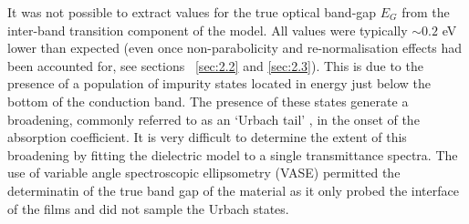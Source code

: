 \documentclass[final,5p,times]{elsarticle}
\begin{document}
It was not possible to extract values for the true optical band-gap $E_G$ from the inter-band transition component of the model. All values were typically $\sim 0.2$ eV lower than expected (even once non-parabolicity and re-normalisation effects had been accounted for, see sections ~\ref{sec:2.2} and \ref{sec:2.3}).  This is due to the presence of a population of impurity states located in energy just below the bottom of the conduction band. The presence of these states generate a broadening, commonly referred to as an `Urbach tail' \cite{Urbach1953}, in the onset of the absorption coefficient. It is very difficult to determine the extent of this broadening by fitting the dielectric model to a single transmittance spectra. The use of variable angle spectroscopic ellipsometry (VASE) permitted the determinatin of the true band gap of the material as it only probed the interface of the films and did not sample the Urbach states.
\end{document}
